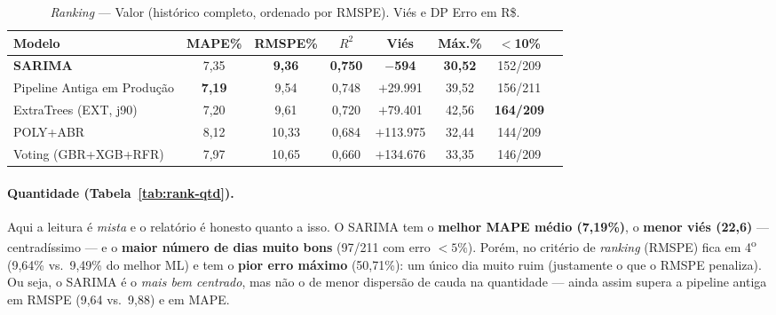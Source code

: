 \documentclass[11pt,a4paper]{article}
\begin{document}
\begin{table}[H]
\centering
\caption{\emph{Ranking} --- Valor (histórico completo, ordenado por RMSPE). Viés e DP Erro em R\$.}
\label{tab:rank-valor}
\small
\setlength{\tabcolsep}{4.5pt}
\begin{tabular}{@{}lccccccc@{}}
\toprule
Modelo & MAPE\% & RMSPE\% & $R^2$ & Viés & Máx.\% & $<$10\% \\
\midrule
\textbf{SARIMA}                & 7,35 & \textbf{9,36} & \textbf{0,750} & \textbf{$-$594}   & \textbf{30,52} & 152/209 \\
Pipeline Antiga em Produção    & \textbf{7,19} & 9,54 & 0,748 & $+$29.991 & 39,52 & 156/211 \\
ExtraTrees (EXT, j90)          & 7,20 & 9,61 & 0,720 & $+$79.401 & 42,56 & \textbf{164/209} \\
POLY+ABR                       & 8,12 & 10,33 & 0,684 & $+$113.975 & 32,44 & 144/209 \\
Voting (GBR+XGB+RFR)           & 7,97 & 10,65 & 0,660 & $+$134.676 & 33,35 & 146/209 \\
\bottomrule
\end{tabular}
\end{table}

\paragraph{Quantidade (Tabela~\ref{tab:rank-qtd}).} Aqui a leitura é \emph{mista} e o relatório é
honesto quanto a isso. O SARIMA tem o \textbf{melhor MAPE médio (7,19\%)}, o \textbf{menor viés
(22,6)} --- centradíssimo --- e o \textbf{maior número de dias muito bons} (97/211 com erro
$<5\%$). Porém, no critério de \emph{ranking} (RMSPE) fica em 4\textsuperscript{o} (9,64\% vs.\
9,49\% do melhor ML) e tem o \textbf{pior erro máximo} (50,71\%): um único dia muito ruim
(justamente o que o RMSPE penaliza). Ou seja, o SARIMA é o \emph{mais bem centrado}, mas não o de
menor dispersão de cauda na quantidade --- ainda assim supera a pipeline antiga em RMSPE (9,64 vs.\
9,88) e em MAPE.
\end{document}
